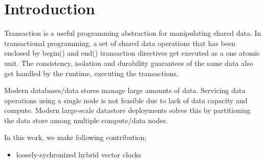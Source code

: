 \section{Introduction}
Transaction is a useful programming abstraction for manipulating 
shared data. In transactional programming,  a set of  shared data 
operations that has been enclosed by begin() and end() transaction 
directives get executed as a one atomic unit. The consistency, 
isolation and durability guarantees of the same data also 
get handled by the runtime, executing the transactions. 

Modern databases/data stores manage large amounts of data. 
Servicing data operations using a single node is not feasible 
due to lack of data capacity and compute. Modern large-scale 
datastore deployments solves this by partitioning the 
data store among multiple compute/data nodes. 




In this work, we make following contribution;
\begin{itemize}
	\item{loosely-sychronized hybrid vector clocks}
\end{itemize}

